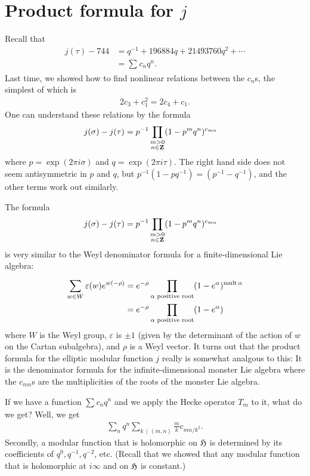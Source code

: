 \documentclass[11pt, oneside,margin=1in]{article}
\begin{document}
\section{Product formula for $j$}
Recall that
\begin{align*}
	j(\tau) - 744 &= q ^{-1} + 196884q + 21493760q^2 + \cdots\\
		      &= \sum_{}^{} c_nq^n.
\end{align*}
Last time, we showed how to find nonlinear relations between the $c_n$s, the simplest of which is
\begin{align*}
	2c_3 + c_1^2 = 2c_4 + c_1.
\end{align*}
One can understand these relations by the formula
\begin{align*}
	j(\sigma)-j(\tau) &= p^{-1} \prod_{\substack{ m > 0\\n\in \mathbf Z}} (1-p^mq^n)^{c_{mn}}
\end{align*}
where $p=\exp(2\pi i \sigma)$ and $q = \exp(2\pi i \tau)$. The right hand side does not seem antisymmetric in $p$ and $q$, but $p^{-1}(1-pq^{-1}) = (p^{-1}-q^{-1})$, and the other terms work out similarly.

The formula \begin{align*}
	j(\sigma)-j(\tau) &= p^{-1} \prod_{\substack{ m > 0\\n\in \mathbf Z}} (1-p^mq^n)^{c_{mn}}
\end{align*}
is very similar to the Weyl denominator formula for a finite-dimensional Lie algebra:
\begin{align*}
	\sum_{w\in W}^{} \varepsilon(w)e^{w (-\rho)} &= e^{-\rho} \prod_{\alpha \textrm{ positive root}}  (1-e^\alpha)^{\operatorname{mult} \alpha} \\&= e^{-\rho} \prod_{\alpha \textrm{ positive root}}  (1-e^\alpha)
\end{align*}
where $W$ is the Weyl group, $\varepsilon$ is $\pm 1$ (given by the determinant of the action of $w$ on the Cartan subalgebra), and $\rho $ is a Weyl vector. It turns out that the product formula for the elliptic modular function $j$ really is somewhat analgous to this: It is the denominator formula for the infinite-dimensional monster Lie algebra where the $c_{mn}$s are the multiplicities of the roots of the monster Lie algebra.

If we have a function $\sum_{}^{} c_nq^n$ and we apply the Hecke operator $T_m$ to it, what do we get? Well, we get
\begin{align*}
	\sum_{n}^{} q^n \sum_{k\, \mid \, (m,n)}^{} \frac{m}{k}c_{mn/k^2}.
\end{align*}
Secondly, a modular function that is holomorphic on $\mathfrak H$ is determined by its coefficients of $q^0,q^{-1}, q^{-2}$, etc. (Recall that we showed that any modular function that is holomorphic at $i\infty$ and on $\mathfrak H$ is constant.)
\end{document}
